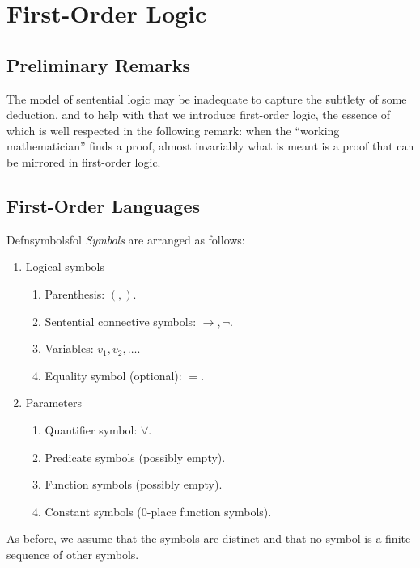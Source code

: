 \chapter{First-Order Logic}
\setcounter{section}{-1}

\section{Preliminary Remarks}

The model of sentential logic may be inadequate to capture the subtlety of some deduction, and to help with that we introduce first-order logic, the essence of which is well respected in the following remark:
when the ``working mathematician'' finds a proof, almost invariably what is meant is a proof that can be mirrored in first-order logic.

\section{First-Order Languages}

\begin{reference}{Defn}{symbolsfol}
  \textit{Symbols} are arranged as follows:
  \begin{enumerate}
    \item Logical symbols
          \begin{enumerate}
            \item Parenthesis: $(,)$.
            \item Sentential connective symbols: $\rightarrow, \neg$.
            \item Variables: $v_1,v_2,\dots$.
            \item Equality symbol (optional): $=$.
          \end{enumerate}
    \item Parameters
          \begin{enumerate}
            \item Quantifier symbol: $\forall$.
            \item Predicate symbols (possibly empty).
            \item Function symbols (possibly empty).
            \item Constant symbols ($0$-place function symbols).\qedhere
          \end{enumerate}
  \end{enumerate}
\end{reference}

As before, we assume that the symbols are distinct and that no symbol is a finite sequence of other symbols.

